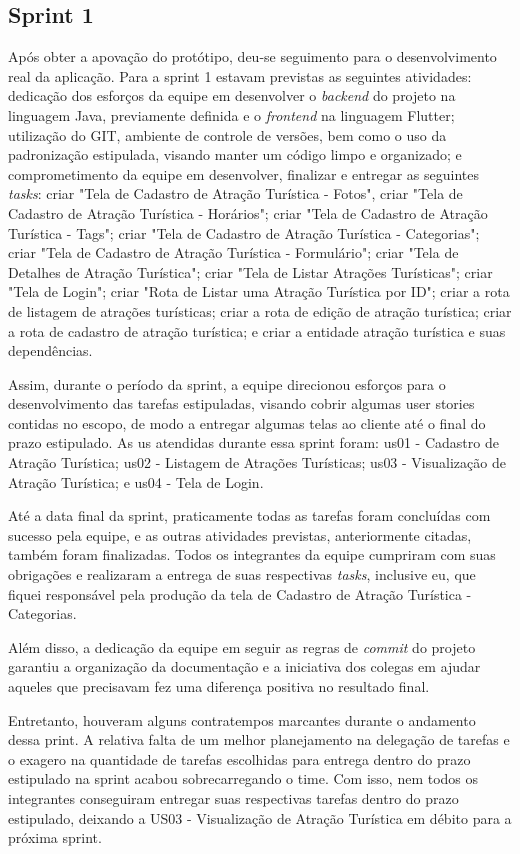 \subsection{Sprint 1}

Após obter a apovação do protótipo, deu-se seguimento para o desenvolvimento real da aplicação. Para a sprint 1 estavam previstas as seguintes atividades: dedicação dos esforços da equipe em desenvolver o \textit{backend} do projeto na linguagem Java, previamente definida e o \textit{frontend} na linguagem Flutter; utilização do GIT, ambiente de controle de versões, bem como o uso da padronização estipulada, visando manter um código limpo e organizado; e comprometimento da equipe em desenvolver, finalizar e entregar as seguintes \textit{tasks}: criar "Tela de Cadastro de Atração Turística - Fotos", criar "Tela de Cadastro de Atração Turística - Horários"; criar "Tela de Cadastro de Atração Turística - Tags"; criar "Tela de Cadastro de Atração Turística - Categorias"; criar "Tela de Cadastro de Atração Turística - Formulário"; criar "Tela de Detalhes de Atração Turística"; criar "Tela de Listar Atrações Turísticas"; criar "Tela de Login"; criar "Rota de Listar uma Atração Turística por ID"; criar a rota de listagem de atrações turísticas; criar a rota de edição de atração turística; criar a rota de cadastro de atração turística; e criar a entidade atração turística e suas dependências.

Assim, durante o período da sprint, a equipe direcionou esforços para o desenvolvimento das tarefas estipuladas, visando cobrir algumas user stories contidas no escopo, de modo a entregar algumas telas ao cliente até o final do prazo estipulado. As \ac {us} atendidas durante essa sprint foram: \ac{us}01 - Cadastro de Atração Turística; \ac{us}02 - Listagem de Atrações Turísticas; \ac{us}03 - Visualização de Atração Turística; e \ac{us}04 - Tela de Login.

Até a data final da sprint, praticamente todas as tarefas foram concluídas com sucesso pela equipe, e as outras atividades previstas, anteriormente citadas, também foram finalizadas. Todos os integrantes da equipe cumpriram com suas obrigações e realizaram a entrega de suas respectivas \textit{tasks}, inclusive eu, que fiquei responsável pela produção da tela de Cadastro de Atração Turística - Categorias. 

Além disso, a dedicação da equipe em seguir as regras de \textit{commit} do projeto garantiu a organização da documentação e a iniciativa dos colegas em ajudar aqueles que precisavam fez uma diferença positiva no resultado final.

Entretanto, houveram alguns contratempos marcantes durante o andamento dessa print. A relativa falta de um melhor planejamento na delegação de tarefas e o exagero na quantidade de tarefas escolhidas para entrega dentro do prazo estipulado na sprint acabou sobrecarregando o time. Com isso, nem todos os integrantes conseguiram entregar suas respectivas tarefas dentro do prazo estipulado, deixando a US03 - Visualização de Atração Turística em débito para a próxima sprint.